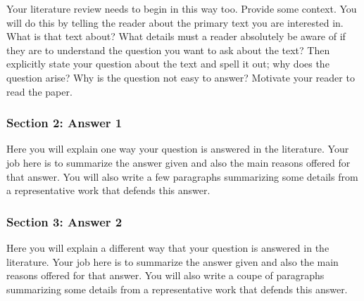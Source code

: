 \documentclass[oneside]{article}
\begin{document}
Your literature review needs to begin in this way too. Provide some
context. You will do this by telling the reader about the primary text you are interested in. What is that text about? What details must a reader absolutely be aware of if they are to understand the question you want to ask about the text? Then explicitly state your question about the text and spell it out; why does the question arise? Why is the question not easy to answer? Motivate your reader to read the paper. 


\subsubsection*{Section 2: Answer 1}\label{section-2-answer-1}

Here you will explain one way your question is answered in the
literature. Your job here is to summarize the answer given and also the
main reasons offered for that answer. You will also write a few
paragraphs summarizing some details from a representative work that
defends this answer.

\subsubsection*{Section 3: Answer 2}\label{section-3-answer-2}

Here you will explain a different way that your question is answered in
the literature. Your job here is to summarize the answer given and also
the main reasons offered for that answer. You will also write a coupe of
paragraphs summarizing some details from a representative work that
defends this answer.
\end{document}
